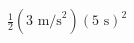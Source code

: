 \documentclass[preview]{standalone}
\begin{document}
\begin{align*}
\frac{1}{2}(3 \text{ m/s}^2)(5 \text{ s})^2
\end{align*}
\end{document}

